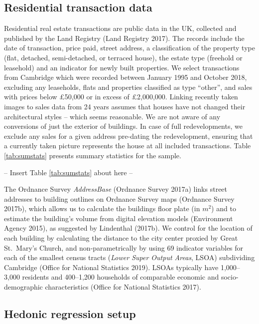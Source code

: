 \documentclass[]{article}
\begin{document}
\hypertarget{residential-transaction-data}{%
\subsection{Residential transaction
data}\label{residential-transaction-data}}

Residential real estate transactions are public data in the UK,
collected and published by the Land Registry (Land Registry 2017). The
records include the date of transaction, price paid, street address, a
classification of the property type (flat, detached, semi-detached, or
terraced house), the estate type (freehold or leasehold) and an
indicator for newly built properties. We select transactions from
Cambridge which were recorded between January 1995 and October 2018,
excluding any leaseholds, flats and properties classified as type
``other'', and sales with prices below £50,000 or in excess of
£2,000,000. Linking recently taken images to sales data from 24 years
assumes that houses have not changed their architectural styles -- which
seems reasonable. We are not aware of any conversions of just the
exterior of buildings. In case of full redevelopments, we exclude any
sales for a given address pre-dating the redevelopment, ensuring that a
currently taken picture represents the house at all included
transactions. Table \ref{tab:sumstats} presents summary statistics for
the sample.

\begin{center}
  -- Insert Table \ref{tab:sumstats} about here --
\end{center}

The Ordnance Survey \emph{AddressBase} (Ordnance Survey 2017a) links
street addresses to building outlines on Ordnance Survey maps (Ordnance
Survey 2017b), which allows us to calculate the buildings floor plate
(in \(m^2\)) and to estimate the building's volume from digital
elevation models (Environment Agency 2015), as suggested by Lindenthal
(2017b). We control for the location of each building by calculating the
distance to the city center proxied by Great St.~Mary's Church, and
non-parametrically by using 69 indicator variables for each of the
smallest census tracts (\emph{Lower Super Output Areas}, LSOA)
subdividing Cambridge (Office for National Statistics 2019). LSOAs
typically have 1,000--3,000 residents and 400--1,200 households of
comparable economic and socio-demographic characteristics (Office for
National Statistics 2017).

\hypertarget{hedonic-regression-setup}{%
\subsection{Hedonic regression setup}\label{hedonic-regression-setup}}
\end{document}
